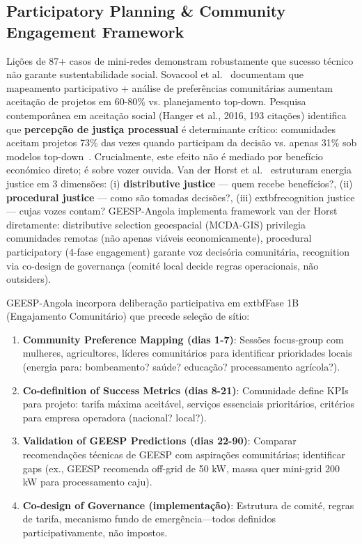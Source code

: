 \documentclass[12pt, a4paper]{article}
\begin{document}
\subsection{Participatory Planning & Community Engagement Framework}

Lições de 87+ casos de mini-redes demonstram robustamente que sucesso técnico não garante sustentabilidade social. Sovacool et al.~\citep{Sovacool2020} documentam que mapeamento participativo + análise de preferências comunitárias aumentam aceitação de projetos em 60-80\% vs. planejamento top-down. Pesquisa contemporânea em aceitação social (Hanger et al., 2016, 193 citações) identifica que \textbf{percepção de justiça processual} é determinante crítico: comunidades aceitam projetos 73\% das vezes quando participam da decisão vs. apenas 31\% sob modelos top-down~\citep{Hanger2016}. Crucialmente, este efeito não é mediado por benefício económico direto; é sobre vozer ouvida. Van der Horst et al.~\citep{VanderHorst2021} estruturam energia justice em 3 dimensões: (i) \textbf{distributive justice} — quem recebe benefícios?, (ii) \textbf{procedural justice} — como são tomadas decisões?, (iii) 	extbf{recognition justice} — cujas vozes contam? GEESP-Angola implementa framework van der Horst diretamente: distributive selection geoespacial (MCDA-GIS) privilegia comunidades remotas (não apenas viáveis economicamente), procedural participatory (4-fase engagement) garante voz decisória comunitária, recognition via co-design de governança (comité local decide regras operacionais, não outsiders).

GEESP-Angola incorpora deliberação participativa em 	extbf{Fase 1B (Engajamento Comunitário)} que precede seleção de sítio:

\begin{enumerate}
\item \textbf{Community Preference Mapping (dias 1-7)}: Sessões focus-group com mulheres, agricultores, líderes comunitários para identificar prioridades locais (energia para: bombeamento? saúde? educação? processamento agrícola?).
\item \textbf{Co-definition of Success Metrics (dias 8-21)}: Comunidade define KPIs para projeto: tarifa máxima aceitável, serviços essenciais prioritários, critérios para empresa operadora (nacional? local?).
\item \textbf{Validation of GEESP Predictions (dias 22-90)}: Comparar recomendações técnicas de GEESP com aspirações comunitárias; identificar gaps (ex., GEESP recomenda off-grid de 50 kW, massa quer mini-grid 200 kW para processamento caju).
\item \textbf{Co-design of Governance (implementação)}: Estrutura de comité, regras de tarifa, mecanismo fundo de emergência—todos definidos participativamente, não impostos.
\end{enumerate}
\end{document}
